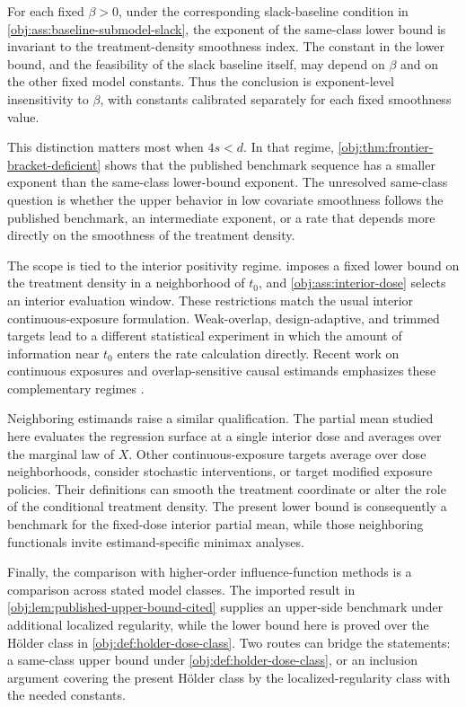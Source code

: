 \documentclass[11pt]{article}
\begin{document}
For each fixed \(\beta>0\), under the corresponding slack-baseline condition in \cref{obj:ass:baseline-submodel-slack}, the exponent of the same-class lower bound is invariant to the treatment-density smoothness index. The constant in the lower bound, and the feasibility of the slack baseline itself, may depend on \(\beta\) and on the other fixed model constants. Thus the conclusion is exponent-level insensitivity to \(\beta\), with constants calibrated separately for each fixed smoothness value.

This distinction matters most when \(4s<d\). In that regime, \cref{obj:thm:frontier-bracket-deficient} shows that the published benchmark sequence has a smaller exponent than the same-class lower-bound exponent. The unresolved same-class question is whether the upper behavior in low covariate smoothness follows the published benchmark, an intermediate exponent, or a rate that depends more directly on the smoothness of the treatment density.

The scope is tied to the interior positivity regime.  imposes a fixed lower bound on the treatment density in a neighborhood of \(t_0\), and \cref{obj:ass:interior-dose} selects an interior evaluation window. These restrictions match the usual interior continuous-exposure formulation. Weak-overlap, design-adaptive, and trimmed targets lead to a different statistical experiment in which the amount of information near \(t_0\) enters the rate calculation directly. Recent work on continuous exposures and overlap-sensitive causal estimands emphasizes these complementary regimes \citep{hejazi2022,doss2022,hudson2023,shi2024,zhang2024,schindl2024,bonvini2024}.

Neighboring estimands raise a similar qualification. The partial mean studied here evaluates the regression surface at a single interior dose and averages over the marginal law of \(X\). Other continuous-exposure targets average over dose neighborhoods, consider stochastic interventions, or target modified exposure policies. Their definitions can smooth the treatment coordinate or alter the role of the conditional treatment density. The present lower bound is consequently a benchmark for the fixed-dose interior partial mean, while those neighboring functionals invite estimand-specific minimax analyses.

Finally, the comparison with higher-order influence-function methods is a comparison across stated model classes. The imported result in \cref{obj:lem:published-upper-bound-cited} supplies an upper-side benchmark under additional localized regularity, while the lower bound here is proved over the Hölder class in \cref{obj:def:holder-dose-class}. Two routes can bridge the statements: a same-class upper bound under \cref{obj:def:holder-dose-class}, or an inclusion argument covering the present Hölder class by the localized-regularity class with the needed constants.
\end{document}
